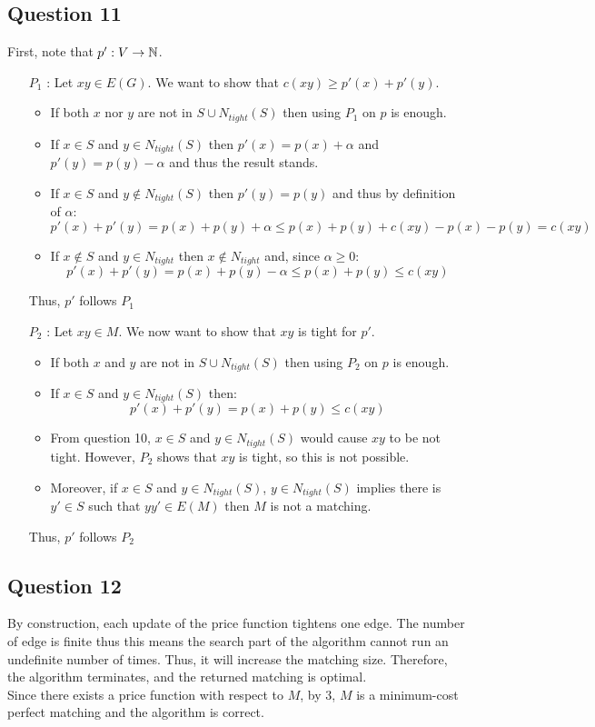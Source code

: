 \documentclass{cours}
\begin{document}
\subsection{Question 11}
First, note that $p' : V \rightarrow \mathbb{N}$. 
\begin{itemize}
    \item[$P_{1}$ : ] Let $xy \in E(G)$. We want to show that $c(xy) \geq p'(x) + p'(y)$.
    \begin{itemize}
        \item If both $x$ nor $y$ are not in $S \cup N_{tight}(S)$ then using $P_{1}$ on $p$ is enough. 
        \item If $x \in S$ and $y \in N_{tight}(S)$ then $p'(x) = p(x) + \alpha$ and $p'(y) = p(y) - \alpha$ and thus the result stands.
        \item If $x \in S$ and $y \notin N_{tight}(S)$ then $p'(y) = p(y)$ and thus by definition of $\alpha$: 
        \[
            p'(x) + p'(y) = p(x) + p(y) + \alpha \leq p(x) + p(y) + c(xy) - p(x) - p(y) = c(xy)
        \]
        \item If $x \notin S$ and $y \in N_{tight}$ then $x \notin N_{tight}$ and, since $\alpha \geq 0$:
        \[
            p'(x) + p'(y) = p(x) + p(y) - \alpha \leq p(x) + p(y) \leq c(xy)
        \]
    \end{itemize}
    Thus, $p'$ follows $P_{1}$
    \item[$P_{2}$ : ] Let $xy \in M$. We now want to show that $xy$ is tight for $p'$. 
    \begin{itemize}
        \item If both $x$ and $y$ are not in $S \cup N_{tight}(S)$ then using $P_{2}$ on $p$ is enough. 
        \item If $x \in S$ and $y \in N_{tight}(S)$ then: 
        \[
            p'(x) + p'(y) = p(x) + p(y) \leq c(xy)
        \]
        \item From question 10, $x \in S$ and $y \in N_{tight}(S)$ would cause $xy$ to be not tight. However, $P_{2}$ shows that $xy$ is tight, so this is not possible.
        \item Moreover, if $x\in S$ and $y \in N_{tight}(S)$, $y \in N_{tight}(S)$ implies there is $y' \in S$ such that $yy' \in E(M)$ then $M$ is not a matching. 
    \end{itemize}
    Thus, $p'$ follows $P_{2}$
\end{itemize}

\subsection{Question 12}
By construction, each update of the price function tightens one edge. The number of edge is finite thus this means the search part of the algorithm cannot run an undefinite number of times. Thus, it will increase the matching size. Therefore, the algorithm terminates, and the returned matching is optimal. \\
Since there exists a price function with respect to $M$, by $3$, $M$ is a minimum-cost perfect matching and the algorithm is correct. 
\end{document}

